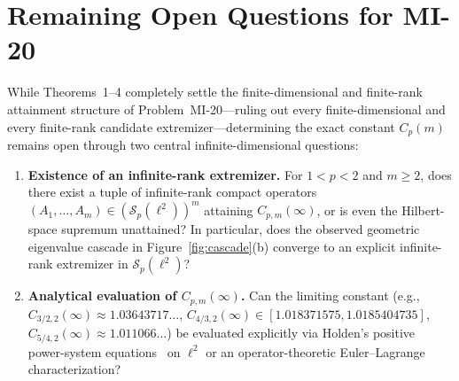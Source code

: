 \documentclass[10pt,letterpaper]{article}
\newcommand{\Sp}{\mathcal{S}_p}
\begin{document}
\section{Remaining Open Questions for MI-20}

While Theorems~1--4 completely settle the finite-dimensional and finite-rank attainment structure of Problem~MI-20—ruling out every finite-dimensional and every finite-rank candidate extremizer—determining the exact constant $C_p(m)$ remains open through two central infinite-dimensional questions:
\begin{enumerate}[leftmargin=1.6em,itemsep=3pt]
  \item \textbf{Existence of an infinite-rank extremizer.} For $1 < p < 2$ and $m \ge 2$, does there exist a tuple of infinite-rank compact operators $(A_1,\dots,A_m) \in (\Sp(\ell^2))^m$ attaining $C_{p,m}(\infty)$, or is even the Hilbert-space supremum unattained? In particular, does the observed geometric eigenvalue cascade in Figure~\ref{fig:cascade}(b) converge to an explicit infinite-rank extremizer in $\Sp(\ell^2)$?
  \item \textbf{Analytical evaluation of $C_{p,m}(\infty)$.} Can the limiting constant (e.g., $C_{3/2,2}(\infty) \approx 1.03643717\dots$, $C_{4/3,2}(\infty) \in [1.018371575, 1.0185404735]$, $C_{5/4,2}(\infty) \approx 1.011066\dots$) be evaluated explicitly via Holden's positive power-system equations~\cite{Holden2026} on $\ell^2$ or an operator-theoretic Euler--Lagrange characterization?
\end{enumerate}
\end{document}
